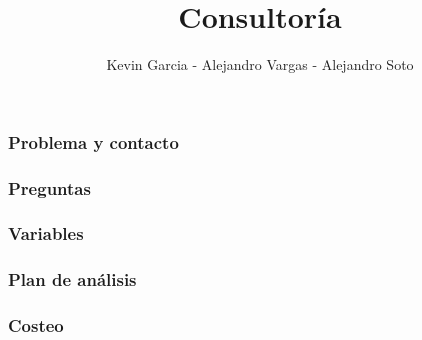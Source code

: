 \documentclass[12pt]{beamer}
\author{Kevin Garcia - Alejandro Vargas - Alejandro Soto}
\title{Consultoría}
\begin{document}
\justify
\begin{frame}
\titlepage
\end{frame}


\begin{frame}
\frametitle{Problema y contacto}
\end{frame}

\begin{frame}
\frametitle{Preguntas}
\end{frame}

\begin{frame}
\frametitle{Variables}
\end{frame}

\begin{frame}
\frametitle{Plan de análisis}
\end{frame}

\begin{frame}
\frametitle{Costeo}
\end{frame}
\end{document}
